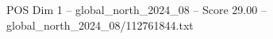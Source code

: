 \begin{textsample}{POS Dim 1 – global\_north\_2024\_08 – Score 29.00 – global\_north\_2024\_08/112761844.txt}
\end{textsample}
